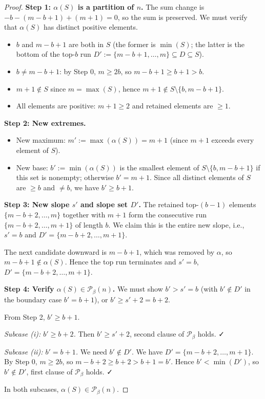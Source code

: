 \begin{proof}

\textbf{Step 1: $\alpha(S)$ is a partition of $n$.}
The sum change is $-b - (m - b + 1) + (m + 1) = 0$, so the sum is preserved. We must verify that $\alpha(S)$ has distinct positive elements.
\begin{itemize}
\item $b$ and $m - b + 1$ are both in $S$ (the former is $\min(S)$; the latter is the bottom of the top-$b$ run $D' := \{m - b + 1, \ldots, m\} \subseteq D \subseteq S$).
\item $b \neq m - b + 1$: by Step 0, $m \geq 2b$, so $m - b + 1 \geq b + 1 > b$.
\item $m + 1 \notin S$ since $m = \max(S)$, hence $m + 1 \notin S \setminus \{b, m - b + 1\}$.
\item All elements are positive: $m + 1 \geq 2$ and retained elements are $\geq 1$.
\end{itemize}

\textbf{Step 2: New extremes.}
\begin{itemize}
\item New maximum: $m' := \max(\alpha(S)) = m + 1$ (since $m + 1$ exceeds every element of $S$).
\item New base: $b' := \min(\alpha(S))$ is the smallest element of $S \setminus \{b, m - b + 1\}$ if this set is nonempty; otherwise $b' = m + 1$. Since all distinct elements of $S$ are $\geq b$ and $\neq b$, we have $b' \geq b + 1$.
\end{itemize}

\textbf{Step 3: New slope $s'$ and slope set $D'$.}
The retained top-$(b-1)$ elements $\{m - b + 2, \ldots, m\}$ together with $m + 1$ form the consecutive run $\{m - b + 2, \ldots, m + 1\}$ of length $b$. We claim this is the entire new slope, i.e., $s' = b$ and $D' = \{m - b + 2, \ldots, m + 1\}$.

The next candidate downward is $m - b + 1$, which was removed by $\alpha$, so $m - b + 1 \notin \alpha(S)$. Hence the top run terminates and $s' = b$, $D' = \{m - b + 2, \ldots, m + 1\}$.

\textbf{Step 4: Verify $\alpha(S) \in \mathcal{P}_\beta(n)$.}
We must show $b' > s' = b$ (with $b' \notin D'$ in the boundary case $b' = b + 1$), or $b' \geq s' + 2 = b + 2$.

From Step 2, $b' \geq b + 1$.


\emph{Subcase (i): $b' \geq b + 2$.} Then $b' \geq s' + 2$, second clause of $\mathcal{P}_\beta$ holds. ✓

\emph{Subcase (ii): $b' = b + 1$.} We need $b' \notin D'$. We have $D' = \{m - b + 2, \ldots, m + 1\}$. By Step 0, $m \geq 2b$, so $m - b + 2 \geq b + 2 > b + 1 = b'$. Hence $b' < \min(D')$, so $b' \notin D'$, first clause of $\mathcal{P}_\beta$ holds. ✓

In both subcases, $\alpha(S) \in \mathcal{P}_\beta(n)$.

\end{proof}


